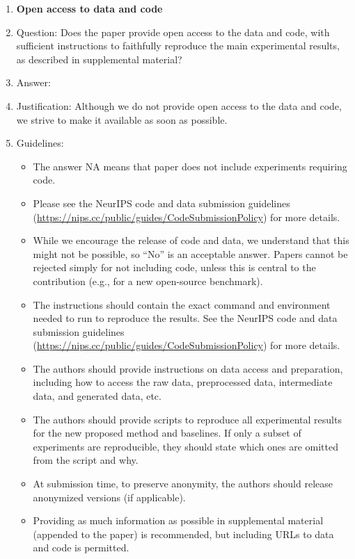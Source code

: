 \documentclass{article} %
\newcounter{ct}
\theoremstyle{definition}
\theoremstyle{remark}
\begin{document}
\begin{enumerate}
\item {\bf Open access to data and code}
    \item[] Question: Does the paper provide open access to the data and code, with sufficient instructions to faithfully reproduce the main experimental results, as described in supplemental material?
    \item[] Answer: \answerNo{} %
    \item[] Justification: Although we do not provide open access to the data and code, we strive to make it available as soon as possible.
    \item[] Guidelines:
    \begin{itemize}
        \item The answer NA means that paper does not include experiments requiring code.
        \item Please see the NeurIPS code and data submission guidelines (\url{https://nips.cc/public/guides/CodeSubmissionPolicy}) for more details.
        \item While we encourage the release of code and data, we understand that this might not be possible, so “No” is an acceptable answer. Papers cannot be rejected simply for not including code, unless this is central to the contribution (e.g., for a new open-source benchmark).
        \item The instructions should contain the exact command and environment needed to run to reproduce the results. See the NeurIPS code and data submission guidelines (\url{https://nips.cc/public/guides/CodeSubmissionPolicy}) for more details.
        \item The authors should provide instructions on data access and preparation, including how to access the raw data, preprocessed data, intermediate data, and generated data, etc.
        \item The authors should provide scripts to reproduce all experimental results for the new proposed method and baselines. If only a subset of experiments are reproducible, they should state which ones are omitted from the script and why.
        \item At submission time, to preserve anonymity, the authors should release anonymized versions (if applicable).
        \item Providing as much information as possible in supplemental material (appended to the paper) is recommended, but including URLs to data and code is permitted.
    \end{itemize}



\end{enumerate}
\end{document}
